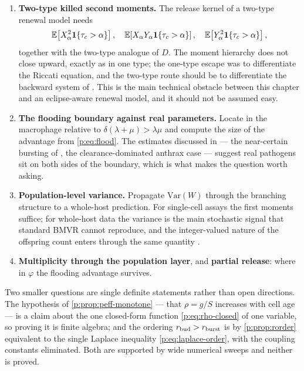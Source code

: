 \begin{enumerate}[leftmargin=1.9em]
\item \textbf{Two-type killed second moments.} The release kernel of a
two-type renewal model needs
\begin{equation*}
\mathbb{E}\!\left[X_\alpha^2\mathbf 1\{\tau_c>\alpha\}\right],\quad
\mathbb{E}\!\left[X_\alpha Y_\alpha\mathbf 1\{\tau_c>\alpha\}\right],\quad
\mathbb{E}\!\left[Y_\alpha^2\mathbf 1\{\tau_c>\alpha\}\right],
\end{equation*}
together with the two-type analogue of $D$. The moment hierarchy does not close upward, exactly as in
one type; the one-type escape was to differentiate the Riccati equation, and
the two-type route should be to differentiate the backward system of
\ChTwoType{}. This is the main technical obstacle between this chapter and
an eclipse-aware renewal model, and it should not be assumed easy.
\item \textbf{The flooding boundary against real parameters.} Locate \yp{}
in the macrophage relative to $\delta(\lambda+\mu)>\lambda\mu$ and compute
the size of the advantage from \cref{p:eq:flood}. The estimates discussed in
\ChDist{} --- the near-certain bursting of \ft{}
\cite{carruthers2020stochastic}, the clearance-dominated anthrax case ---
suggest real pathogens sit on both sides of the boundary, which is what
makes the question worth asking.
\item \textbf{Population-level variance.} Propagate $\mathrm{Var}(W)$
through the branching structure to a whole-host prediction. For single-cell
assays the first moments suffice; for whole-host data the variance is the
main stochastic signal that standard BMVR cannot reproduce, and the
integer-valued nature of the offspring count enters through the same
quantity \cite{williams2024reproduction}.
\item \textbf{Multiplicity through the population layer}, and
\textbf{partial release}: where in $\varphi$ the flooding advantage
survives.
\end{enumerate}

Two smaller questions are single definite statements rather than open
directions. The hypothesis of \cref{p:prop:peff-monotone} --- that
$\rho=g/S$ increases with cell age --- is a claim about the one closed-form
function \cref{p:eq:rho-closed} of one variable, so proving it is finite
algebra; and the ordering $r_{\rm bud}>r_{\rm burst}$ is by
\cref{p:prop:rorder} equivalent to the single Laplace inequality
\cref{p:eq:laplace-order}, with the coupling constants eliminated. Both are
supported by wide numerical sweeps and neither is proved.

